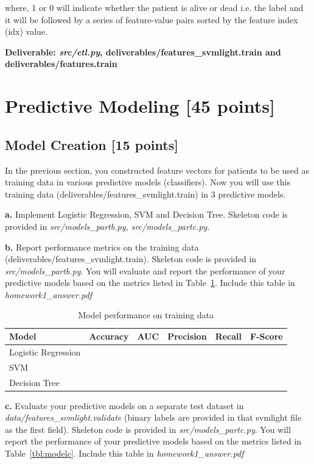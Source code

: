 \documentclass[12pt]{article}
\begin{document}
where, 1 or 0 will indicate whether the patient is alive or dead i.e. the label and it will be followed by a series of feature-value pairs sorted by the feature index (idx) value. 
\newline

\textbf{Deliverable: \textit{src/etl.py}, deliverables/features\_svmlight.train and deliverables/features.train}

\section{Predictive Modeling [45 points]}
\subsection{Model Creation [15 points]}
In the previous section, you constructed feature vectors for patients to be used as training data in various predictive models (classifiers). Now you will use this training data (deliverables/features\_svmlight.train) in 3 predictive models. 

\textbf{a.} Implement Logistic Regression, SVM and Decision Tree. Skeleton code is provided in \textit{src/models\_partb.py, src/models\_partc.py}.

\textbf{b.} Report performance metrics on the training data (deliverables/features\_svmlight.train). Skeleton code is provided in \textit{src/models\_partb.py}. You will evaluate and report the performance of your predictive models based on the metrics listed in Table~\ref{tbl:modelb}. Include this table in \textit{homework1\_answer.pdf}\\ 

\begin{table}[h]
	\centering
	\begin{tabular}{@{}lccccc@{}}
		\toprule
		Model & Accuracy & AUC & Precision & Recall & F-Score  \\ \midrule
		Logistic Regression & & & & &\\
		SVM & & & & &\\
		Decision Tree & & & & &\\
		\bottomrule
	\end{tabular}
	\caption{Model performance on training data}
	\label{tbl:modelb}
\end{table}

\textbf{c.} Evaluate your predictive models on a separate test dataset in \textit{data/features\_svmlight.validate} (binary labels are provided in that svmlight file as the first field). Skeleton code is provided in \textit{src/models\_partc.py}. You will report the performance of your predictive models based on the metrics listed in Table~\ref{tbl:modelc}. Include this table in \textit{homework1\_answer.pdf}\\ 
\end{document}
